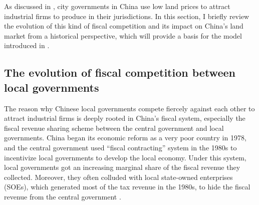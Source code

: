 As discussed in , city governments in China use low land prices to
attract industrial firms to produce in their jurisdictions. In this section,
I briefly review the evolution of this kind of fiscal competition and
its impact on China's land market from a historical perspective,
which will provide a basis for the model introduced in .

\subsection{The evolution of fiscal competition between local governments}
The reason why Chinese local governments compete fiercely against each other
to attract industrial firms is deeply rooted in China's fiscal system,
especially the fiscal revenue sharing scheme between the central government and local governments.
China began its economic reform as a very poor country in 1978,
and the central government used ``fiscal contracting'' system in the 1980s
to incentivize local governments to develop the local economy.
Under this system, local governments got an increasing marginal share of the fiscal revenue
they collected. Moreover, they often colluded with local state-owned enterprises (SOEs),
which generated most of the tax revenue in the 1980s,
to hide the fiscal revenue from the central government \citep{su2017china}.

